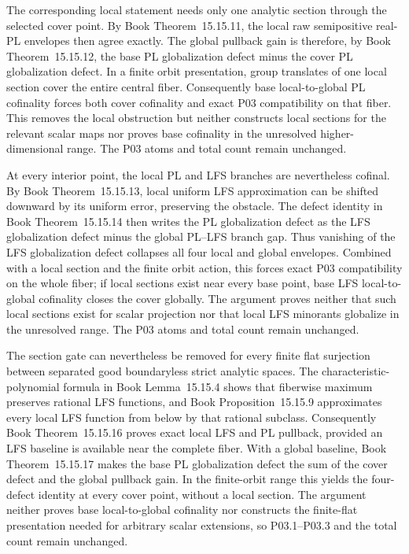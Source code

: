 \documentclass[11pt,a4paper]{article}
\theoremstyle{definition}
\theoremstyle{remark}
\begin{document}
The corresponding local statement needs only one analytic section through
the selected cover point.  By
Book Theorem~15.15.11, the local raw semipositive
real-PL envelopes then agree exactly.  The global pullback gain is therefore,
by Book Theorem~15.15.12, the base PL
globalization defect minus the cover PL globalization defect.  In a finite
orbit presentation, group translates of one local section cover the entire
central fiber.  Consequently base local-to-global PL cofinality forces both
cover cofinality and exact P03 compatibility on that fiber.  This removes the
local obstruction but neither constructs local sections for the relevant
scalar maps nor proves base cofinality in the unresolved higher-dimensional
range.  The P03 atoms and total count remain unchanged.

At every interior point, the local PL and LFS branches are nevertheless
cofinal.  By Book Theorem~15.15.13, local uniform LFS
approximation can be shifted downward by its uniform error, preserving the
obstacle.  The defect identity in Book Theorem~15.15.14 then
writes the PL globalization defect as the LFS globalization defect minus the
global PL--LFS branch gap.  Thus vanishing of the LFS globalization defect
collapses all four local and global envelopes.  Combined with a local section
and the finite orbit action, this forces exact P03 compatibility on the whole
fiber; if local sections exist near every base point, base LFS
local-to-global cofinality closes the cover globally.  The argument proves
neither that such local sections exist for scalar projection nor that local
LFS minorants globalize in the unresolved range.  The P03 atoms and total
count remain unchanged.

The section gate can nevertheless be removed for every finite flat
surjection between separated good boundaryless strict analytic spaces.
The characteristic-polynomial formula in
Book Lemma~15.15.4 shows that fiberwise maximum
preserves rational LFS functions, and
Book Proposition~15.15.9 approximates every local LFS
function from below by that rational subclass.  Consequently
Book Theorem~15.15.16 proves exact local LFS
and PL pullback, provided an LFS baseline is available near the complete
fiber.  With a global baseline,
Book Theorem~15.15.17 makes the base PL
globalization defect the sum of the cover defect and the global pullback
gain.  In the finite-orbit range this yields the four-defect identity at
every cover point, without a local section.  The argument neither proves
base local-to-global cofinality nor constructs the finite-flat presentation
needed for arbitrary scalar extensions, so P03.1--P03.3 and the total count
remain unchanged.
\end{document}
